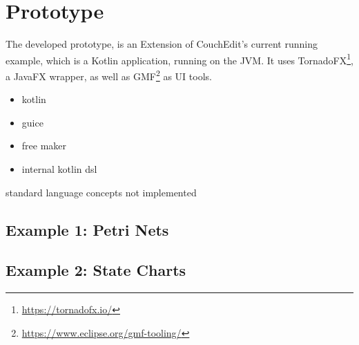 \chapter{Prototype}
The developed prototype, is an Extension of CouchEdit's current running example, which is a Kotlin application, running on the JVM. It uses TornadoFX\footnote{\url{https://tornadofx.io/}}, a JavaFX wrapper, as well as GMF\footnote{\url{https://www.eclipse.org/gmf-tooling/}} as UI tools.


\begin{itemize}
  \item kotlin
  \item guice
  \item free maker
  \item internal kotlin dsl
\end{itemize}


standard language concepts not implemented 

\section{Example 1: Petri Nets}

\section{Example 2: State Charts}
